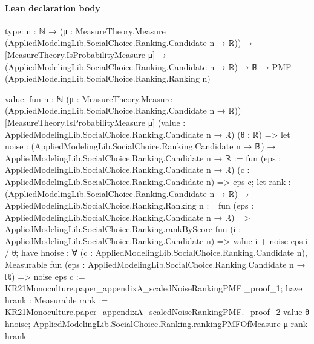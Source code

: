 \documentclass[10pt]{article}
\begin{document}
\paragraph{Lean declaration body}
\begin{ReviewVerbatim}
type:
{n : ℕ} →
  (μ : MeasureTheory.Measure (AppliedModelingLib.SocialChoice.Ranking.Candidate n → ℝ)) →
    [MeasureTheory.IsProbabilityMeasure μ] →
      (AppliedModelingLib.SocialChoice.Ranking.Candidate n → ℝ) →
        ℝ → PMF (AppliedModelingLib.SocialChoice.Ranking.Ranking n)

value:
fun {n : ℕ} (μ : MeasureTheory.Measure (AppliedModelingLib.SocialChoice.Ranking.Candidate n → ℝ))
    [MeasureTheory.IsProbabilityMeasure μ] (value : AppliedModelingLib.SocialChoice.Ranking.Candidate n → ℝ) (θ : ℝ) =>
  let noise :
    (AppliedModelingLib.SocialChoice.Ranking.Candidate n → ℝ) →
      AppliedModelingLib.SocialChoice.Ranking.Candidate n → ℝ :=
    fun (eps : AppliedModelingLib.SocialChoice.Ranking.Candidate n → ℝ)
      (c : AppliedModelingLib.SocialChoice.Ranking.Candidate n) =>
    eps c;
  let rank :
    (AppliedModelingLib.SocialChoice.Ranking.Candidate n → ℝ) → AppliedModelingLib.SocialChoice.Ranking.Ranking n :=
    fun (eps : AppliedModelingLib.SocialChoice.Ranking.Candidate n → ℝ) =>
    AppliedModelingLib.SocialChoice.Ranking.rankByScore fun (i : AppliedModelingLib.SocialChoice.Ranking.Candidate n) =>
      value i + noise eps i / θ;
  have hnoise :
    ∀ (c : AppliedModelingLib.SocialChoice.Ranking.Candidate n),
      Measurable fun (eps : AppliedModelingLib.SocialChoice.Ranking.Candidate n → ℝ) => noise eps c :=
    KR21Monoculture.paper_appendixA_scaledNoiseRankingPMF._proof_1;
  have hrank : Measurable rank := KR21Monoculture.paper_appendixA_scaledNoiseRankingPMF._proof_2 value θ hnoise;
  AppliedModelingLib.SocialChoice.Ranking.rankingPMFOfMeasure μ rank hrank
\end{ReviewVerbatim}
\end{document}
